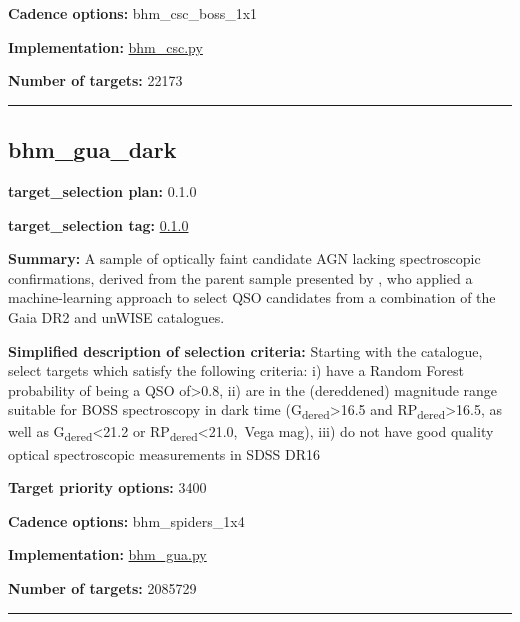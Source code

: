 \noindent\textbf{Cadence options:} bhm\_csc\_boss\_1x1

\noindent\textbf{Implementation:}
\href{https://github.com/sdss/target_selection/blob/0.1.0/python/target_selection/cartons/bhm_csc.py}{bhm\_csc.py}

\noindent\textbf{Number of targets:} 22173

\begin{center}\rule{0.5\linewidth}{0.5pt}\end{center}

\hypertarget{bhm_gua_dark_plan0.1.0}{%
\subsection{bhm\_gua\_dark}\label{bhm_gua_dark_plan0.1.0}}

\noindent\textbf{target\_selection plan:} 0.1.0

\noindent\textbf{target\_selection tag:}
\href{https://github.com/sdss/target_selection/tree/0.1.0/}{0.1.0}

\noindent\textbf{Summary:} A sample of optically faint candidate AGN lacking
spectroscopic confirmations, derived from the parent sample presented by
\citet{Shu2019}, who applied a machine-learning approach to select QSO
candidates from a combination of the Gaia DR2 and unWISE catalogues.

\noindent\textbf{Simplified description of selection criteria:} Starting with the
\citet{Shu2019} catalogue, select targets which satisfy the following
criteria: i) have a Random Forest probability of being a QSO
of\textgreater0.8, ii) are in the (dereddened) magnitude range suitable
for BOSS spectroscopy in dark time
(G\textsubscript{dered}\textgreater16.5 and
RP\textsubscript{dered}\textgreater16.5, as well as
G\textsubscript{dered}\textless21.2 or
RP\textsubscript{dered}\textless21.0,~Vega mag), iii) do not have good
quality optical spectroscopic measurements in SDSS DR16


\noindent\textbf{Target priority options:} 3400

\noindent\textbf{Cadence options:} bhm\_spiders\_1x4

\noindent\textbf{Implementation:}
\href{https://github.com/sdss/target_selection/blob/0.1.0/python/target_selection/cartons/bhm_gua.py}{bhm\_gua.py}

\noindent\textbf{Number of targets:} 2085729

\begin{center}\rule{0.5\linewidth}{0.5pt}\end{center}

